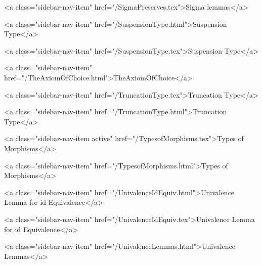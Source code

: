       
    
      
        
          <a class="sidebar-nav-item" href="/SigmaPreserves.tex">Sigma lemmas</a>
        
      
    
      
        
          <a class="sidebar-nav-item" href="/SuspensionType.html">Suspension Type</a>
        
      
    
      
        
          <a class="sidebar-nav-item" href="/SuspensionType.tex">Suspension Type</a>
        
      
    
      
        
          <a class="sidebar-nav-item" href="/TheAxiomOfChoice.html">TheAxiomOfChoice</a>
        
      
    
      
        
          <a class="sidebar-nav-item" href="/TruncationType.tex">Truncation Type</a>
        
      
    
      
        
          <a class="sidebar-nav-item" href="/TruncationType.html">Truncation Type</a>
        
      
    
      
        
          <a class="sidebar-nav-item active" href="/TypesofMorphisms.tex">Types of Morphisms</a>
        
      
    
      
        
          <a class="sidebar-nav-item" href="/TypesofMorphisms.html">Types of Morphisms</a>
        
      
    
      
        
          <a class="sidebar-nav-item" href="/UnivalenceIdEquiv.html">Univalence Lemma for id Equivalence</a>
        
      
    
      
        
          <a class="sidebar-nav-item" href="/UnivalenceIdEquiv.tex">Univalence Lemma for id Equivalence</a>
        
      
    
      
        
          <a class="sidebar-nav-item" href="/UnivalenceLemmas.html">Univalence Lemmas</a>
        
